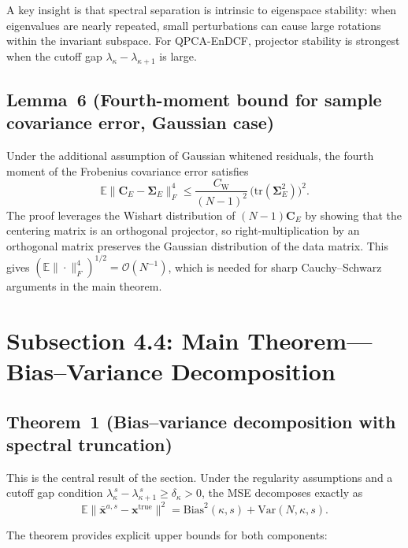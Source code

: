 \documentclass[11pt]{article}
\begin{document}
\noindent
A key insight is that spectral separation is intrinsic to eigenspace stability:
when eigenvalues are nearly repeated, small perturbations can cause large
rotations within the invariant subspace. For QPCA-EnDCF, projector stability is
strongest when the cutoff gap $\lambda_\kappa - \lambda_{\kappa+1}$ is large.

\subsection*{Lemma~6 (Fourth-moment bound for sample covariance error, Gaussian case)}

Under the additional assumption of Gaussian whitened residuals, the
fourth moment of the Frobenius covariance error satisfies
\[
  \mathbb{E}\|\mathbf{C}_E - \boldsymbol{\Sigma}_E\|_F^4
  \le
  \frac{C_{\mathrm{W}}}{(N-1)^2}\,
  \bigl(\mathrm{tr}(\boldsymbol{\Sigma}_E^2)\bigr)^2.
\]
The proof leverages the Wishart distribution of $(N-1)\mathbf{C}_E$ by showing
that the centering matrix is an orthogonal projector, so right-multiplication
by an orthogonal matrix preserves the Gaussian distribution of the data matrix.
This gives $(\mathbb{E}\|\cdot\|_F^4)^{1/2} = \mathcal{O}(N^{-1})$, which is
needed for sharp Cauchy--Schwarz arguments in the main theorem.


\section*{Subsection 4.4: Main Theorem---Bias--Variance Decomposition}

\subsection*{Theorem~1 (Bias--variance decomposition with spectral truncation)}

This is the central result of the section. Under the regularity assumptions and
a cutoff gap condition $\lambda_\kappa^{\,s} - \lambda_{\kappa+1}^{\,s} \ge
\delta_\kappa > 0$, the MSE decomposes exactly as
\[
  \mathbb{E}\|\bar{\mathbf{x}}^{a,s} - \mathbf{x}^{\mathrm{true}}\|^2
  =
  \mathrm{Bias}^2(\kappa, s) + \mathrm{Var}(N, \kappa, s).
\]

The theorem provides explicit upper bounds for both components:
\end{document}

